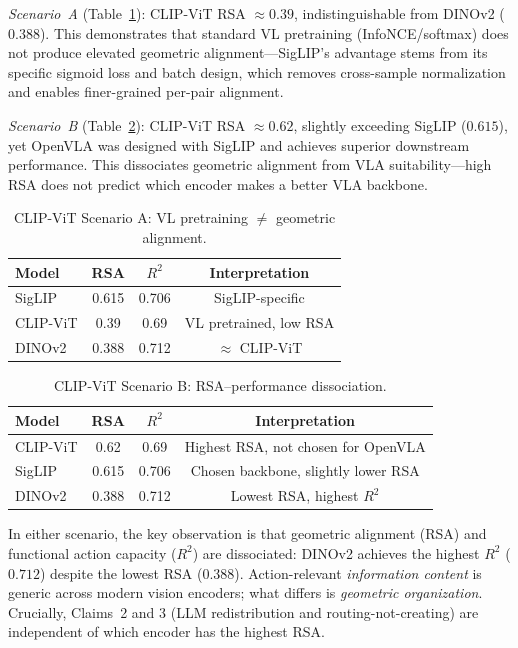 \documentclass[letterpaper]{article}
\begin{document}
\textit{Scenario~A} (Table~\ref{tab:clip-scenario-a}): CLIP-ViT RSA $\approx 0.39$, indistinguishable from DINOv2 ($0.388$). This demonstrates that standard VL pretraining (InfoNCE/softmax) does not produce elevated geometric alignment---SigLIP's advantage stems from its specific sigmoid loss and batch design, which removes cross-sample normalization and enables finer-grained per-pair alignment.

\textit{Scenario~B} (Table~\ref{tab:clip-scenario-b}): CLIP-ViT RSA $\approx 0.62$, slightly exceeding SigLIP ($0.615$), yet OpenVLA was designed with SigLIP and achieves superior downstream performance. This dissociates geometric alignment from VLA suitability---high RSA does not predict which encoder makes a better VLA backbone.

\begin{table}[t]
\centering
\caption{CLIP-ViT Scenario A: VL pretraining $\neq$ geometric alignment.}
\label{tab:clip-scenario-a}
\begin{tabular}{lccc}
\toprule
\textbf{Model} & \textbf{RSA} & \textbf{$R^2$} & \textbf{Interpretation} \\
\midrule
SigLIP & 0.615 & 0.706 & SigLIP-specific \\
CLIP-ViT & 0.39 & 0.69 & VL pretrained, low RSA \\
DINOv2 & 0.388 & 0.712 & $\approx$ CLIP-ViT \\
\bottomrule
\end{tabular}
\end{table}

\begin{table}[t]
\centering
\caption{CLIP-ViT Scenario B: RSA--performance dissociation.}
\label{tab:clip-scenario-b}
\begin{tabular}{lccc}
\toprule
\textbf{Model} & \textbf{RSA} & \textbf{$R^2$} & \textbf{Interpretation} \\
\midrule
CLIP-ViT & 0.62 & 0.69 & Highest RSA, not chosen for OpenVLA \\
SigLIP & 0.615 & 0.706 & Chosen backbone, slightly lower RSA \\
DINOv2 & 0.388 & 0.712 & Lowest RSA, highest $R^2$ \\
\bottomrule
\end{tabular}
\end{table}

In either scenario, the key observation is that geometric alignment (RSA) and functional action capacity ($R^2$) are dissociated: DINOv2 achieves the highest $R^2$ ($0.712$) despite the lowest RSA ($0.388$). Action-relevant \emph{information content} is generic across modern vision encoders; what differs is \emph{geometric organization}. Crucially, Claims~2 and 3 (LLM redistribution and routing-not-creating) are independent of which encoder has the highest RSA.
\end{document}
